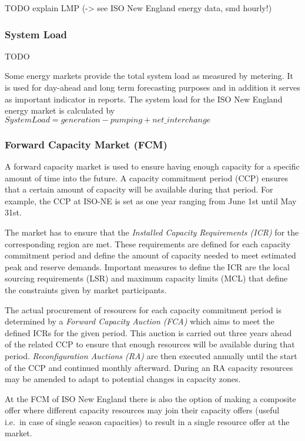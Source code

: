 TODO explain LMP (-> see ISO New England energy data, smd hourly!)

\subsubsection{System Load}

TODO

Some energy markets provide the total system load as measured by metering. It is used for day-ahead and long term forecasting purposes and in addition it serves as important indicator in reports. The system load for the ISO New England energy market is calculated by $System Load = generation - pumping + net\_interchange$


\subsubsection{Forward Capacity Market (FCM)} 

A forward capacity market is used to ensure having enough capacity for a specific amount of time into the future. A capacity commitment period (CCP) ensures that a certain amount of capacity will be available during that period. For example, the CCP at ISO-NE is set as one year ranging from June 1st until May 31st. 

The market has to ensure that the \emph{Installed Capacity Requirements (ICR)} for the corresponding region are met. These requirements are defined for each capacity commitment period and define the amount of capacity needed to meet estimated peak and reserve demands. Important measures to define the ICR are the local sourcing requirements (LSR) and maximum capacity limits (MCL) that define the constraints given by market participants. %

The actual procurement of resources for each capacity commitment period is determined by a \emph{Forward Capacity Auction (FCA)} which aims to meet the defined ICRs for the given period.
This auction is carried out three years ahead of the related CCP to ensure that enough resources will be available during that period. \emph{Reconfiguration Auctions (RA)} are then executed annually until the start of the CCP and continued monthly afterward. During an RA capacity resources may be amended to adapt to potential changes in capacity zones. 

At the FCM of ISO New England there is also the option of making a composite offer where different capacity resources may join their capacity offers (useful i.e.~in case of single season capacities) to result in a single resource offer at the market. 

